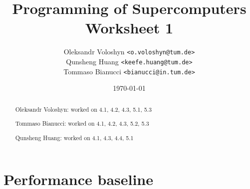 \documentclass{article}
\title{Programming of Supercomputers\\Worksheet 1}
\author{
	Oleksandr Voloshyn \texttt{<o.voloshyn@tum.de>}\\ 
	Qunsheng Huang \texttt{<keefe.huang@tum.de>}\\ 
	Tommaso Bianucci \texttt{<bianucci@in.tum.de>}
}
\date{\today}
\begin{document}
\maketitle
\renewcommand{\abstractname}{Group members's contributions}
\begin{abstract}
	\begin{center}
	Oleksandr Voloshyn: worked on 4.1, 4.2, 4.3, 5.1, 5.3

	Tommaso Bianucci: worked on 4.1, 4.2, 4.3, 5.2, 5.3
	
	Qunsheng Huang: worked on 4.1, 4.3, 4.4, 5.1
	\end{center}
\end{abstract}

\section{Performance baseline} %
\end{document}
